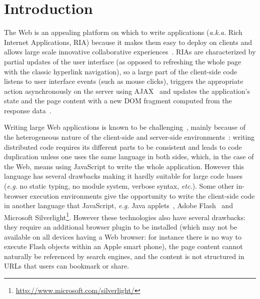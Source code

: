 \documentclass[american,english,runningheads]{llncs}
\newcommand{\eg}{\emph{e.g.}}
\newcommand{\etc}{\emph{etc.}}
\newcommand{\aka}{\emph{a.k.a.}}
\begin{document}
\section{Introduction}
\vspace*{-0.2cm}
The Web is an appealing platform on which to write applications (\aka{} Rich Internet Applications, RIA) because it
makes them easy to deploy on clients and allows large scale innovative collaborative
experiences~\cite{Farrell07_RIA,Mikkonen08_SpaghettiJs}. RIAs are characterized by partial updates of the user
interface (as opposed to refreshing the whole page with the classic hyperlink navigation), so a large part of the
client-side code listens to user interface events (such as mouse clicks), triggers the appropriate action
asynchronously on the server using AJAX~\cite{Garrett05_Ajax} and updates the application’s state and the page content
with a new DOM fragment computed from the response data~\cite{Farrell07_RIA,Busch09_StateOfArtRIA}.

Writing large Web applications is known to be
challenging~\cite{Mikkonen08_SpaghettiJs,Preciado05_RIAMethodologyNecessity}, mainly because of the heterogeneous
nature of the client-side and server-side environments~\cite{Echeverria09_RIA,Kuuskeri09_PartitioningClientServer}:
writing distributed code requires its different parts to be consistent and leads to code duplication unless one uses
the same language in both sides, which, in the case of the Web, means using JavaScript to write the whole
application. However this language has several drawbacks making it hardly suitable for large code bases (\eg{} no
static typing, no module system, verbose syntax, \etc). Some other in-browser execution environments give the
opportunity to write the client-side code in another language that JavaScript, \eg{} Java
applets~\cite{Anuff96_JavaApplets}, Adobe Flash~\cite{Curtis00_Flash} and Microsoft
Silverlight\footnote{\href{http://www.microsoft.com/silverlight/}{http://www.microsoft.com/silverlight/}}. However
these technologies also have several drawbacks: they require an additional browser plugin to be installed (which may
not be available on all devices having a Web browser: for instance there is no way to execute Flash objects within an
Apple smart phone), the page content cannot naturally be referenced by search engines, and the content is not
structured in URLs that users can bookmark or share.
\end{document}
